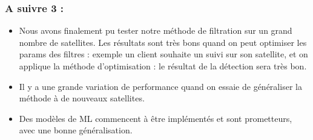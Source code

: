 \documentclass{article}
\begin{document}
\subsubsection{A suivre 3 :}
\begin{itemize}
    \item Nous avons finalement pu tester notre méthode de filtration sur un grand nombre de satellites. Les résultats sont très bons quand on peut optimiser les params des filtres : exemple un client souhaite un suivi sur son satellite, et on applique la méthode d'optimisation : le résultat de la détection sera très bon.
    \item Il y a une grande variation de performance quand on essaie de généraliser la méthode à de nouveaux satellites.
    \item Des modèles de ML commencent à être implémentés et sont prometteurs, avec une bonne généralisation.
\end{itemize}
\end{document}
